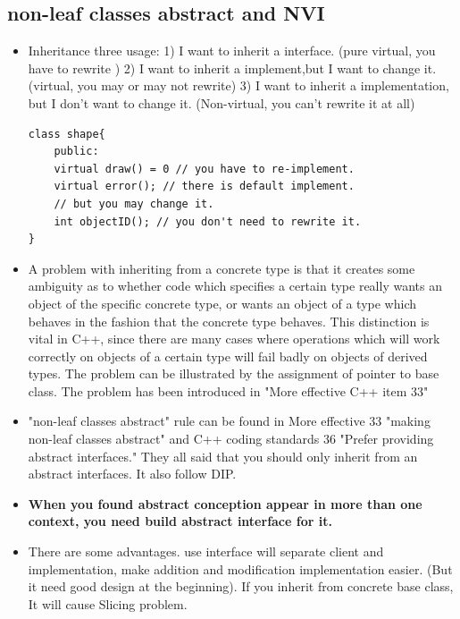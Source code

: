 \documentclass[a4paper,11pt,twoside]{book}
\begin{document}
\subsection{non-leaf classes abstract and NVI}

\begin{itemize}

\item Inheritance three usage: 1) I want to inherit a interface. (pure virtual, you have to rewrite ) 2) I want to inherit a implement,but I want to change it. (virtual, you may or may not rewrite) 3) I want to inherit a implementation, but I don't want to change it. (Non-virtual, you can't rewrite it at all)
\begin{lstlisting}[numbers=none]
class shape{
	public:
	virtual draw() = 0 // you have to re-implement.
	virtual error(); // there is default implement.
	// but you may change it.
	int objectID(); // you don't need to rewrite it.
}	
\end{lstlisting}

	\item A problem with inheriting from a concrete type is that it creates some ambiguity as to whether code which specifies a certain type really wants an object of the specific concrete type, or wants an object of a type which behaves in the fashion that the concrete type behaves. This distinction is vital in C++, since there are many cases where operations which will work correctly on objects of a certain type will fail badly on objects of derived types. The problem can be illustrated by the assignment of pointer to base class. The problem has been introduced in "More effective C++ item 33"
	

	\item "non-leaf classes abstract" rule can be found in More effective 33 "making non-leaf classes abstract" and C++ coding standards 36 "Prefer providing abstract interfaces." They all said that you should only inherit from an abstract interfaces. It also follow DIP.

	\item \textbf{When you found abstract conception appear in more than one context, you need build abstract interface for it. }

	\item There are some advantages. use interface will separate client and implementation, make addition and modification implementation easier. (But it need good design at the beginning). If you inherit from concrete base class, It will cause Slicing problem. 
	

\end{itemize}
\end{document}
